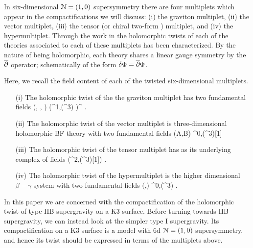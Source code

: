 \documentclass[../main.tex]{subfiles}
\begin{document}
In six-dimensional $\mathcal{N}=(1,0)$ supersymmetry there are four multiplets which appear in the compactifications we will discuss: (i) the graviton multiplet, (ii) the vector multiplet, (iii) the tensor (or chiral two-form \cite{WittenM5}) multiplet, and (iv) the hypermultiplet.
Through the work in \cite{...} the holomorphic twists of each of the theories associated to each of these multiplets has been characterized.
By the nature of being holomorphic, each theory shares a linear gauge symmetry by the $\overline{\partial}$ operator; schematically of the form $\delta \Phi = \overline{\partial} \Phi$.

Here, we recall the field content of each of the twisted six-dimensional multiplets.
\begin{itemize}
\item[(i)] The holomorphic twist of the the graviton multiplet has two fundamental fields
\beqn
(\mu, \rho, \til \alpha) \in \left(\PV^{1,\bu}(\C^3) \cap \ker \div \right)^{} .
\eeqn
\item[(ii)] The holomorphic twist of the vector multiplet is three-dimensional holomorphic BF theory with two fundamental fields
\beqn
(A,B) \in \Omega^{0,\bu}(\C^3)[1]
\eeqn
\item[(iii)] The holomorphic twist of the tensor multiplet has as its underlying complex of fields
\beqn
\alpha \in \left(\Omega^{2,\bu}(\C^3)[1]\right) \cap \ker \del .
\eeqn
\item[(iv)] The holomorphic twist of the hypermultiplet is the higher dimensional $\beta-\gamma$ system with two fundamental fields
\beqn
(\gamma,\beta) \in \Omega^{0,\bu}(\C^3) .
\eeqn
\end{itemize}

In this paper we are concerned with the compactification of the holomorphic twist of type IIB supergravity on a K3 surface.
Before turning towards IIB supergravity, we can instead look at the simpler type I supergravity.
Its compactification on a K3 surface is a model with 6d $\mathcal{N}=(1,0)$ supersymmetry, and hence its twist should be expressed in terms of the multiplets above.
\end{document}
